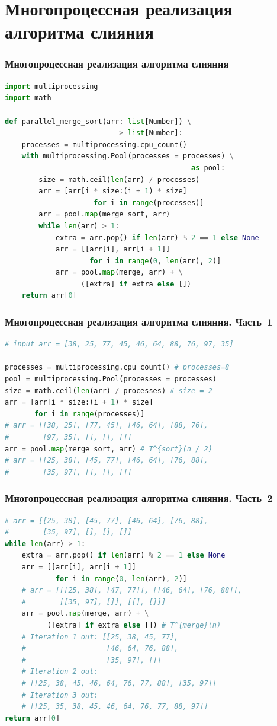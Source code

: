 \documentclass{beamer}
\begin{document}
	\section{Многопроцессная реализация алгоритма слияния}
	\begin{frame}[fragile]
		\frametitle{Многопроцессная реализация алгоритма слияния}
		
		\begin{lstlisting}[language=Python, basicstyle=\footnotesize]		
import multiprocessing
import math

def parallel_merge_sort(arr: list[Number]) \
                          -> list[Number]:
	processes = multiprocessing.cpu_count()
	with multiprocessing.Pool(processes = processes) \
                                            as pool:
		size = math.ceil(len(arr) / processes)
		arr = [arr[i * size:(i + 1) * size] 
					 for i in range(processes)]
		arr = pool.map(merge_sort, arr)
		while len(arr) > 1:
			extra = arr.pop() if len(arr) % 2 == 1 else None
			arr = [[arr[i], arr[i + 1]] 
			        for i in range(0, len(arr), 2)]
			arr = pool.map(merge, arr) + \
			      ([extra] if extra else [])
	return arr[0]
		\end{lstlisting}
	\end{frame}

	\begin{frame}[fragile]
		\frametitle{Многопроцессная реализация алгоритма слияния. Часть~1}
		
		\begin{lstlisting}[language=Python]		
# input arr = [38, 25, 77, 45, 46, 64, 88, 76, 97, 35]

processes = multiprocessing.cpu_count() # processes=8
pool = multiprocessing.Pool(processes = processes)
size = math.ceil(len(arr) / processes) # size = 2
arr = [arr[i * size:(i + 1) * size] 
       for i in range(processes)]
# arr = [[38, 25], [77, 45], [46, 64], [88, 76], 
#        [97, 35], [], [], []]
arr = pool.map(merge_sort, arr) # T^{sort}(n / 2)
# arr = [[25, 38], [45, 77], [46, 64], [76, 88], 
#        [35, 97], [], [], []]
		\end{lstlisting}
	\end{frame}

	\begin{frame}[fragile]
		\frametitle{Многопроцессная реализация алгоритма слияния. Часть~2}
		
		\begin{lstlisting}[language=Python]	
# arr = [[25, 38], [45, 77], [46, 64], [76, 88], 
#        [35, 97], [], [], []]
while len(arr) > 1:
	extra = arr.pop() if len(arr) % 2 == 1 else None
	arr = [[arr[i], arr[i + 1]] 
	        for i in range(0, len(arr), 2)]
	# arr = [[[25, 38], [47, 77]], [[46, 64], [76, 88]], 
	#        [[35, 97], []], [[], []]]
	arr = pool.map(merge, arr) + \
	      ([extra] if extra else []) # T^{merge}(n)
	# Iteration 1 out: [[25, 38, 45, 77], 
	#                   [46, 64, 76, 88], 
	#                   [35, 97], []]
	# Iteration 2 out: 
	# [[25, 38, 45, 46, 64, 76, 77, 88], [35, 97]]
	# Iteration 3 out: 
	# [[25, 35, 38, 45, 46, 64, 76, 77, 88, 97]]
return arr[0]
		\end{lstlisting}
	\end{frame}
\end{document}
